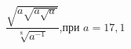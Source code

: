 \begin{ex}[type=simplify_calculate]
	\begin{condition}
		\( \dfrac{\sqrt{a\sqrt{a\sqrt{a}}}}{\sqrt[8]{a^{-1}}} \),\quad при \( a=17,1 \)
	\end{condition}
\end{ex}